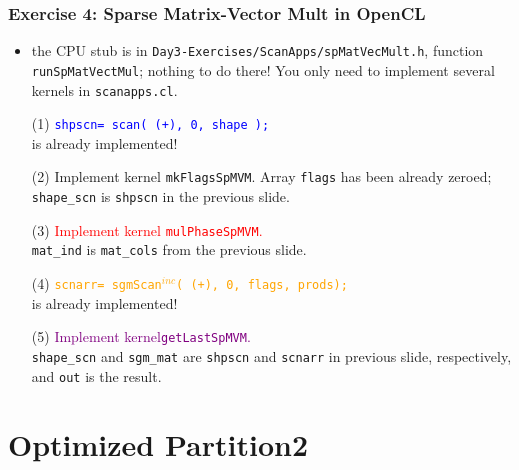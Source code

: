 \documentclass{beamer}
\newcommand{\red}[1]{\textcolor{Red}{{#1}}}
\newcommand{\blue}[1]{\textcolor{Blue}{{#1}}}
\newcommand{\orange}[1]{\textcolor{Orange}{{#1}}}
\newcommand{\purple}[1]{\textcolor{Purple}{{#1}}}
\newcommand{\emphh}[1]{\textcolor{CosGreen}{ #1}}
\newcommand{\mymath}[1]{$ #1 $}
\newcommand{\myindu}[1]{^{#1}}
\begin{document}
\begin{frame}[fragile,t]
  \frametitle{Exercise 4: Sparse Matrix-Vector Mult in OpenCL}

\begin{itemize}
    \item the CPU stub is in {\tt Day3-Exercises/ScanApps/spMatVecMult.h}, function {\tt runSpMatVectMul};
            nothing to do there! You only need to implement several kernels in {\tt scanapps.cl}.\smallskip
    \item[(1)] \blue{\tt shpscn= scan( (+), 0, shape );}\\ is already implemented!
    \item[(2)] \emphh{Implement kernel {\tt mkFlagsSpMVM}.} Array {\tt flags} has been already zeroed;
                {\tt shape\_scn} is {\tt shpscn} in the previous slide.\smallskip
    \item[(3)] \red{Implement kernel {\tt mulPhaseSpMVM}.}\\ 
                {\tt mat\_ind} is {\tt mat\_cols} from the previous slide.\smallskip
    \item[(4)] \orange{\tt scnarr= sgmScan\mymath{\myindu{inc}}( (+), 0, flags, prods);}\\
            is already implemented!\smallskip
    \item[(5)] \purple{Implement kernel{\tt getLastSpMVM}.}\\ {\tt shape\_scn} and
                {\tt sgm\_mat} are {\tt shpscn} and {\tt scnarr} in previous slide,
                respectively, and {\tt out} is the result. 
\end{itemize}

\end{frame}

\section{Optimized Partition2}

\begin{frame}
  \tableofcontents[currentsection]
\end{frame}
\end{document}
